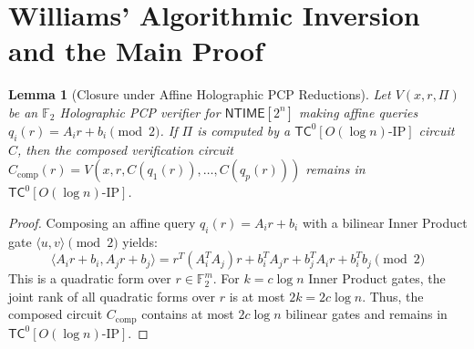 \documentclass[11pt,letterpaper]{article}
\newtheorem{lemma}[theorem]{Lemma}
\newcommand{\NTIME}{\mathsf{NTIME}}
\newcommand{\TC}{\mathsf{TC}}
\newcommand{\F}{\mathbb{F}}
\begin{document}
\section{Williams' Algorithmic Inversion and the Main Proof}

\begin{lemma}[Closure under Affine Holographic PCP Reductions]
\label{lem:pcp_closure}
Let $V(x, r, \Pi)$ be an $\F_2$ Holographic PCP verifier for $\NTIME[2^n]$ making affine queries $q_i(r) = A_i r + b_i \pmod 2$. If $\Pi$ is computed by a $\TC^0[O(\log n)\text{-}\mathrm{IP}]$ circuit $C$, then the composed verification circuit $C_{\mathrm{comp}}(r) = V(x, r, C(q_1(r)), \dots, C(q_p(r)))$ remains in $\TC^0[O(\log n)\text{-}\mathrm{IP}]$.
\end{lemma}

\begin{proof}
Composing an affine query $q_i(r) = A_i r + b_i$ with a bilinear Inner Product gate $\langle u, v \rangle \pmod 2$ yields:
\[
\langle A_i r + b_i, A_j r + b_j \rangle = r^T (A_i^T A_j) r + b_i^T A_j r + b_j^T A_i r + b_i^T b_j \pmod 2
\]
This is a quadratic form over $r \in \F_2^m$. For $k = c \log n$ Inner Product gates, the joint rank of all quadratic forms over $r$ is at most $2k = 2c \log n$. Thus, the composed circuit $C_{\mathrm{comp}}$ contains at most $2c \log n$ bilinear gates and remains in $\TC^0[O(\log n)\text{-}\mathrm{IP}]$.
\end{proof}
\end{document}
